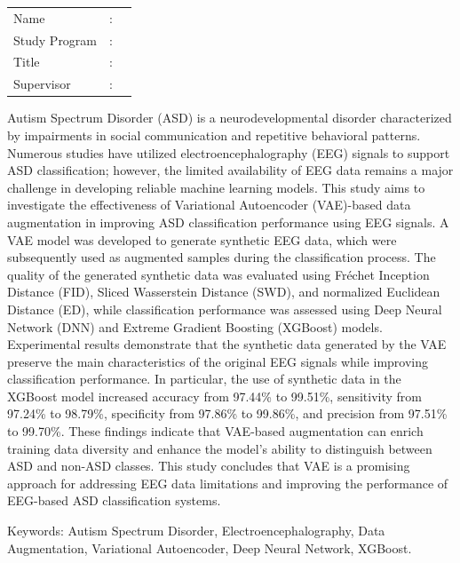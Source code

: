 %
%
%

\vspace*{0.2cm}
{
    \singlespacing
	\setlength{\parindent}{0pt}
	
	\begin{tabular}{@{}l l p{10cm}}
		Name&: & \penulis \\
		Study Program&: & \program \\
		Title&: & \judulInggris \\
		Supervisor&: & \pembimbing \\
	\end{tabular}

	\bigskip
	\bigskip

Autism Spectrum Disorder (ASD) is a neurodevelopmental disorder characterized by impairments in social communication and repetitive behavioral patterns. Numerous studies have utilized electroencephalography (EEG) signals to support ASD classification; however, the limited availability of EEG data remains a major challenge in developing reliable machine learning models. This study aims to investigate the effectiveness of Variational Autoencoder (VAE)-based data augmentation in improving ASD classification performance using EEG signals. A VAE model was developed to generate synthetic EEG data, which were subsequently used as augmented samples during the classification process. The quality of the generated synthetic data was evaluated using Fréchet Inception Distance (FID), Sliced Wasserstein Distance (SWD), and normalized Euclidean Distance (ED), while classification performance was assessed using Deep Neural Network (DNN) and Extreme Gradient Boosting (XGBoost) models. Experimental results demonstrate that the synthetic data generated by the VAE preserve the main characteristics of the original EEG signals while improving classification performance. In particular, the use of synthetic data in the XGBoost model increased accuracy from 97.44\% to 99.51\%, sensitivity from 97.24\% to 98.79\%, specificity from 97.86\% to 99.86\%, and precision from 97.51\% to 99.70\%. These findings indicate that VAE-based augmentation can enrich training data diversity and enhance the model's ability to distinguish between ASD and non-ASD classes. This study concludes that VAE is a promising approach for addressing EEG data limitations and improving the performance of EEG-based ASD classification systems.

	\bigskip

	Keywords:
	Autism Spectrum Disorder, Electroencephalography, Data Augmentation, Variational Autoencoder, Deep Neural Network, XGBoost.
}

\newpage